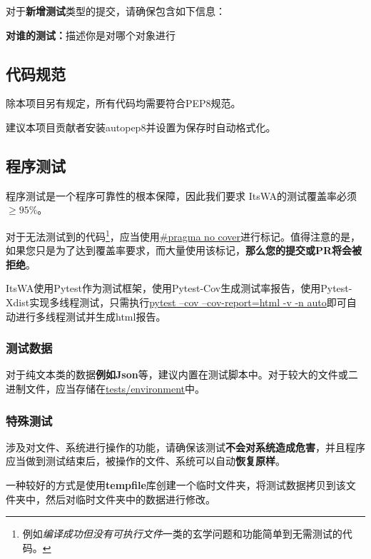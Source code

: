 \documentclass[UTF8]{ctexart}
\newcommand{\itswa}{ItsWA}
\begin{document}
                \noindent 对于\textbf{新增测试}类型的提交，请确保包含如下信息：

                \begin{compactenum}
                    \item \textbf{对谁的测试：}描述你是对哪个对象进行
                \end{compactenum}

        \subsection{代码规范}
            除本项目另有规定，所有代码均需要符合PEP8规范。

            建议本项目贡献者安装autopep8并设置为保存时自动格式化。

        \subsection{程序测试}
            程序测试是一个程序可靠性的根本保障，因此我们要求 \itswa 的测试覆盖率必须 $\geq 95\%$。

            对于无法测试到的代码\footnote{例如\textit{编译成功但没有可执行文件}一类的玄学问题和功能简单到无需测试的代码。}，应当使用\uline{\#pragma no cover}进行标记。值得注意的是，如果您只是为了达到覆盖率要求，而大量使用该标记，\textbf{那么您的提交或PR将会被拒绝}。

            \itswa 使用Pytest作为测试框架，使用Pytest-Cov生成测试率报告，使用Pytest-Xdist实现多线程测试，只需执行\uline{pytest --cov --cov-report=html -v -n auto}即可自动进行多线程测试并生成html报告。

            \subsubsection{测试数据}
                对于纯文本类的数据\textbf{例如Json}等，建议内置在测试脚本中。对于较大的文件或二进制文件，应当存储在\uline{tests/environment}中。

            \subsubsection{特殊测试}
                涉及对文件、系统进行操作的功能，请确保该测试\textbf{不会对系统造成危害}，并且程序应当做到测试结束后，被操作的文件、系统可以自动\textbf{恢复原样}。

                一种较好的方式是使用\textbf{tempfile}库创建一个临时文件夹，将测试数据拷贝到该文件夹中，然后对临时文件夹中的数据进行修改。
\end{document}
